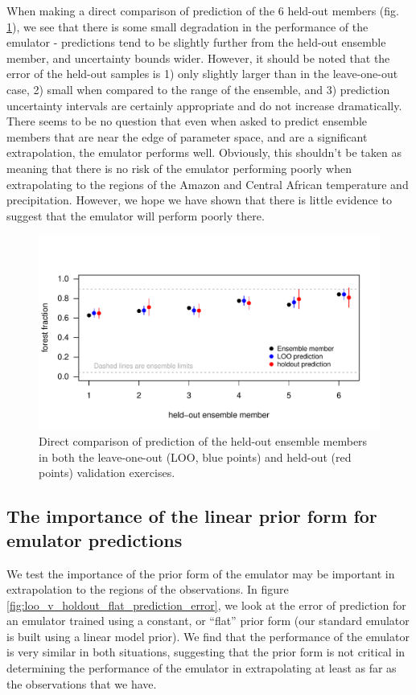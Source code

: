 \documentclass[gmd, manuscript]{copernicus} %
\begin{document}
When making a direct comparison of prediction of the 6 held-out members (fig. \ref{fig:loo_v_holdout1_prediction_error}), we see that there is some small degradation in the performance of the emulator - predictions tend to be slightly further from the held-out ensemble member, and uncertainty bounds wider. However, it should be noted that the error of the held-out samples is 1) only slightly larger than in the leave-one-out case, 2) small when compared to the range of the ensemble, and 3) prediction uncertainty intervals are certainly appropriate and do not increase dramatically. There seems to be no question that even when asked to predict ensemble members that are near the edge of parameter space, and are a significant extrapolation, the emulator performs well. Obviously, this shouldn’t be taken as meaning that there is no risk of the emulator performing poorly when extrapolating to the regions of the Amazon and Central African temperature and precipitation. However, we hope we have shown that there is little evidence to suggest that the emulator will perform poorly there. 

\begin{figure}[t]
\includegraphics[width=12cm]{../graphics/loo_v_holdout1_prediction_error.pdf}
\caption{Direct comparison of prediction of the held-out ensemble members in both the leave-one-out (LOO, blue points) and held-out (red points) validation exercises.}
\label{fig:loo_v_holdout1_prediction_error}
\end{figure}


\subsection{The importance of the linear prior form for emulator predictions}
We test the importance of the prior form of the emulator may be important in extrapolation to the regions of the observations. In figure \ref{fig:loo_v_holdout_flat_prediction_error}, we look at the error of prediction for an emulator trained using a constant, or “flat” prior form (our standard emulator is built using a linear model prior). We find that the performance of the emulator is very similar in both situations, suggesting that the prior form is not critical in determining the performance of the emulator in extrapolating at least as far as the observations that we have.
\end{document}
